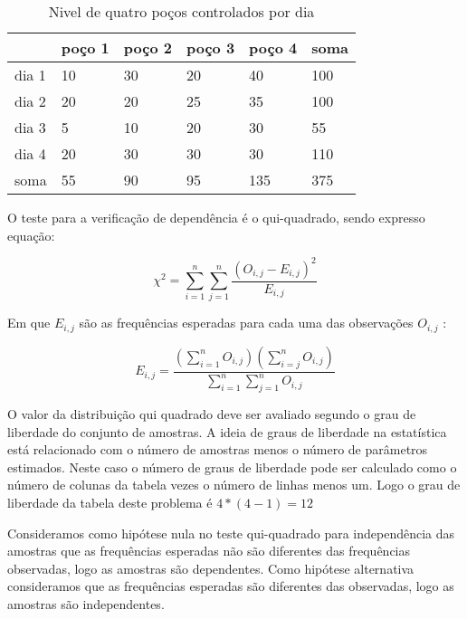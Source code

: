 \begin{table}[H]
	\centering
	\caption{Nivel de quatro poços controlados por dia}
	\label{tabela_pocos}
	\begin{tabular}{l|l|l|l|l|l|}
		\cline{2-6}
		& poço 1 & poço 2 & poço 3 & poço 4 & soma \\ \hline
		\multicolumn{1}{|l|}{dia 1} & 10     & 30     & 20     & 40     & 100  \\ \hline
		\multicolumn{1}{|l|}{dia 2} & 20     & 20     & 25     & 35     & 100  \\ \hline
		\multicolumn{1}{|l|}{dia 3} & 5      & 10     & 20     & 30     & 55   \\ \hline
		\multicolumn{1}{|l|}{dia 4} & 20     & 30     & 30     & 30     & 110  \\ \hline
		\multicolumn{1}{|l|}{soma}  & 55     & 90     & 95     & 135    & 375  \\ \hline
	\end{tabular}
\end{table}

O teste para a verificação de dependência é o qui-quadrado, sendo expresso equação:
   
\begin{equation}\label{quiquadrado}
\chi ^2 = \sum_{i=1}^{n}\sum_{j=1}^{n} \frac{(O_{i,j}-E_{i,j})^2}{E_{i,j}}
\end{equation}

Em que $E_{i,j}$ são as frequências esperadas para cada uma das observações $O_{i,j}$ :

\begin{equation}\label{ezinho}
E_{i,j} = \frac{\left( \sum_{i=1}^{n}O_{i,j}\right) \left( \sum_{i=j}^{n}O_{i,j}\right)}{\sum_{i=1}^{n}\sum_{j=1}^{n} O_{i,j}}
\end{equation}

O valor da distribuição qui quadrado deve ser avaliado segundo o grau de liberdade do conjunto de amostras. A ideia de graus de liberdade na estatística está relacionado com o número de amostras menos o número de parâmetros estimados. Neste caso o número de graus de liberdade pode ser calculado como o número de colunas da tabela vezes o número de linhas menos um. Logo o grau de liberdade da tabela deste problema é $4*(4-1) =12$

Consideramos como hipótese nula no teste qui-quadrado para independência das amostras que as frequências esperadas não são diferentes das frequências observadas, logo as amostras são dependentes. Como hipótese alternativa consideramos que as frequências esperadas são diferentes das observadas, logo as amostras são independentes.


